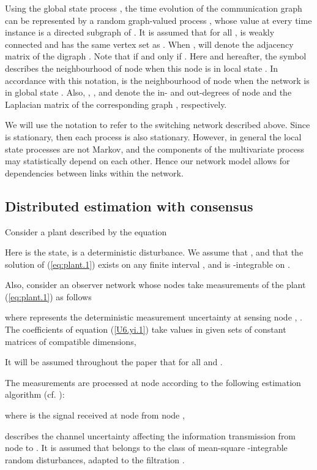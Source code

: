 \documentclass[a4paper,twocolumn]{autart}
\begin{document}
Using the global state process , the time evolution of the
communication graph can be represented by a random graph-valued process
, whose value at every time instance is a directed
subgraph of . It is assumed that for all ,
 is weakly connected and has the same vertex set as
. When , 
 will denote the adjacency
matrix of the digraph . Note that
 if and only if . Here
and hereafter, the symbol  describes the neighbourhood
of node  when this node is in local state . In accordance with
this notation,  is the neighbourhood
of node  when the network is in global state . Also,  
, 
, and  denote the
in- and out-degrees of node  and the Laplacian matrix of the
corresponding graph , respectively.    


We will use the notation  to refer to the
switching network described above. Since  is 
stationary, then each 
process  is also stationary. However, in general the local state
processes  are not Markov, and the components of the
multivariate process  may statistically
depend on each other. Hence our network model allows for
dependencies between links within the network. 

  
\subsection{Distributed estimation with 
  consensus}
Consider a plant described by the equation

Here  is the state,  is a deterministic
disturbance. We assume that , and that the solution of (\ref{eq:plant.1})
exists on any finite interval , and is -integrable on
. 

Also, consider an observer network  whose nodes take measurements of the plant
(\ref{eq:plant.1}) as follows 

where  represents the deterministic measurement 
uncertainty at sensing node , . The 
coefficients of equation (\ref{U6.yi.1}) take values in given sets of
constant matrices of compatible dimensions, 

It will be assumed throughout the paper that  for all  and . 

The measurements  are processed at node  according to the following
estimation algorithm (cf. \cite{SS-2009,U6,LaU1}): 
 
where  is the signal received at node  from node ,

 describes the channel uncertainty affecting the
information 
transmission from node  to . It is assumed that  belongs  to 
the class of mean-square -integrable random disturbances, adapted to the
filtration . 
\end{document}
